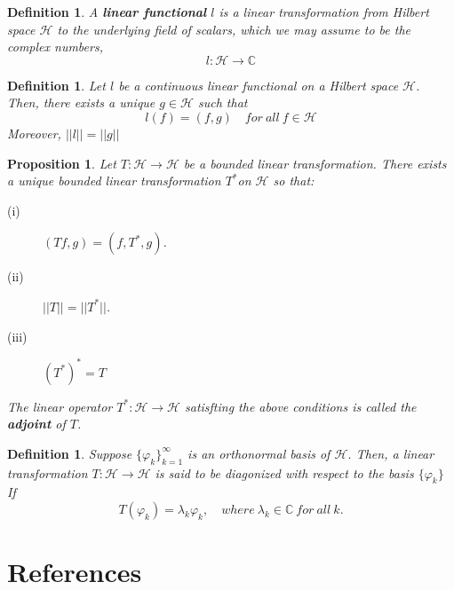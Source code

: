 \documentclass[11pt]{article}
\newtheorem{definition}[theorem]{Definition}
\newtheorem{proposition}[theorem]{Proposition}
\begin{document}
\begin{definition}
    A \textbf{linear functional} $l$ is a linear transformation from Hilbert space $\mathcal{H}$ to the underlying field of scalars, which we may assume to be the complex numbers,
    \[l:\mathcal{H}\to\mathbb{C}\]
\end{definition}

\begin{definition}
    Let $l$ be a continuous linear functional on a Hilbert space $\mathcal{H}$. Then, there exists a unique $g\in\mathcal{H}$ such that
    \[l(f)=(f,g)\quad for\ all\ f\in\mathcal{H}\]
    Moreover, $||l||=||g||$
\end{definition}

\begin{proposition}
    Let $T:\mathcal{H}\to\mathcal{H} $ be a bounded linear transformation. There exists a unique bounded linear transformation $T^*$on $\mathcal{H} $ so that:
    \begin{description}
        \item[(i)] $(Tf,g)=(f,T^*,g)$.
        \item[(ii)] $||T||=||T^*||$.
        \item[(iii)] $(T^*)^*=T$
    \end{description}
    The linear operator $T^*:\mathcal{H}\to\mathcal{H}$ satisfting the above conditions is called the \textbf{adjoint} of $T$.
\end{proposition}

\begin{definition}
    Suppose $\{\varphi_k\}_{k=1}^\infty$ is an orthonormal basis of $\mathcal{H}$. Then, a linear transformation $T:\mathcal{H}\to\mathcal{H}$ is said to be diagonized with respect to the basis $\{\varphi_k\}$ If
    \[T(\varphi_k)=\lambda_k\varphi_k,\quad where\ \lambda_k\in\mathbb{C}\ for\ all\ k.\]
\end{definition}
\section*{References}
\end{document}
